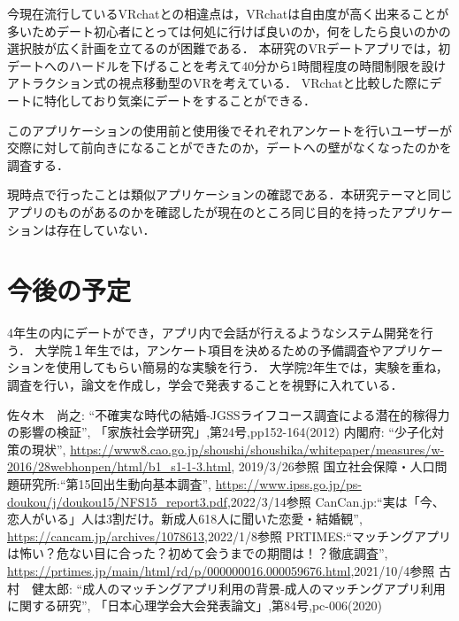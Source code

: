 \documentclass[12pt]{ltjsarticle}
\begin{document}

今現在流行しているVRchatとの相違点は，VRchatは自由度が高く出来ることが多いためデート初心者にとっては何処に行けば良いのか，何をしたら良いのかの選択肢が広く計画を立てるのが困難である．
本研究のVRデートアプリでは，初デートへのハードルを下げることを考えて40分から1時間程度の時間制限を設けアトラクション式の視点移動型のVRを考えている．
VRchatと比較した際にデートに特化しており気楽にデートをすることができる．

このアプリケーションの使用前と使用後でそれぞれアンケートを行いユーザーが交際に対して前向きになることができたのか，デートへの壁がなくなったのかを調査する．

現時点で行ったことは類似アプリケーションの確認である．本研究テーマと同じアプリのものがあるのかを確認したが現在のところ同じ目的を持ったアプリケーションは存在していない．




\section{今後の予定}
4年生の内にデートができ，アプリ内で会話が行えるようなシステム開発を行う．
大学院１年生では，アンケート項目を決めるための予備調査やアプリケーションを使用してもらい簡易的な実験を行う．
大学院2年生では，実験を重ね，調査を行い，論文を作成し，学会で発表することを視野に入れている．

\begin{thebibliography}{99}
 佐々木　尚之: ``不確実な時代の結婚-JGSSライフコース調査による潜在的稼得力の影響の検証'', 「家族社会学研究」,第24号,pp152-164(2012)
 内閣府: ``少子化対策の現状'', \url{https://www8.cao.go.jp/shoushi/shoushika/whitepaper/measures/w-2016/28webhonpen/html/b1_s1-1-3.html}, 2019/3/26参照
国立社会保障・人口問題研究所:``第15回出生動向基本調査'',
\url{https://www.ipss.go.jp/ps-doukou/j/doukou15/NFS15_report3.pdf},2022/3/14参照
CanCan.jp:``実は「今、恋人がいる」人は3割だけ。新成人618人に聞いた恋愛・結婚観'',
\url{https://cancam.jp/archives/1078613},2022/1/8参照
PRTIMES:``マッチングアプリは怖い？危ない目に合った？初めて会うまでの期間は！？徹底調査'',
\url{https://prtimes.jp/main/html/rd/p/000000016.000059676.html},2021/10/4参照
 古村　健太郎: ``成人のマッチングアプリ利用の背景-成人のマッチングアプリ利用に関する研究'', 「日本心理学会大会発表論文」,第84号,pc-006(2020)

\end{thebibliography}
\end{document}
